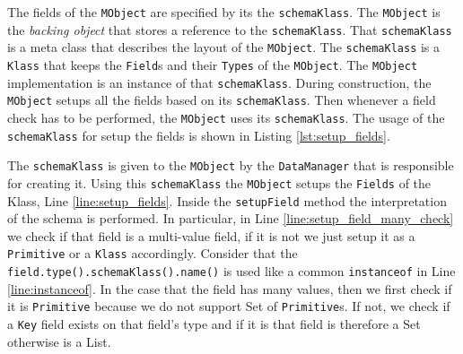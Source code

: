 The fields of the \texttt{MObject} are specified by its the \texttt{schemaKlass}.
The \texttt{MObject} is the \textit{backing object} that stores a reference to the \texttt{schemaKlass}.
That \texttt{schemaKlass} is a meta class that describes the layout of the \texttt{MObject}. 
The \texttt{schemaKlass} is a \texttt{Klass} that keeps the \texttt{Field}s and their \texttt{Types} of the \texttt{MObject}.
The \texttt{MObject} implementation is an instance of that \texttt{schemaKlass}.
During construction, the \texttt{MObject} setups all the fields based on its \texttt{schemaKlass}.
Then whenever a field check has to be performed, the \texttt{MObject} uses its \texttt{schemaKlass}.
The usage of the \texttt{schemaKlass} for setup the fields is shown in Listing \ref{lst:setup_fields}.

The \texttt{schemaKlass} is given to the \texttt{MObject} by the \texttt{DataManager} that  is responsible for creating it.
Using this \texttt{schemaKlass} the \texttt{MObject} setups the \texttt{Fields} of the Klass, Line \ref{line:setup_fields}.
Inside the \texttt{setupField} method the interpretation of the schema is performed.
In particular, in Line \ref{line:setup_field_many_check} we check if that field is a multi-value field, if it is not we just setup it as a \texttt{Primitive} or a \texttt{Klass} accordingly. 
Consider that the \texttt{field.type().schemaKlass().name()} is used like a common \texttt{instanceof} in Line \ref{line:instanceof}.
In the case that the field has many values, then we first check if it is \texttt{Primitive} because we do not support Set of \texttt{Primitive}s.
If not, we check if a \texttt{Key} field exists on that field's type and if it is that field is therefore a Set otherwise is a List.

